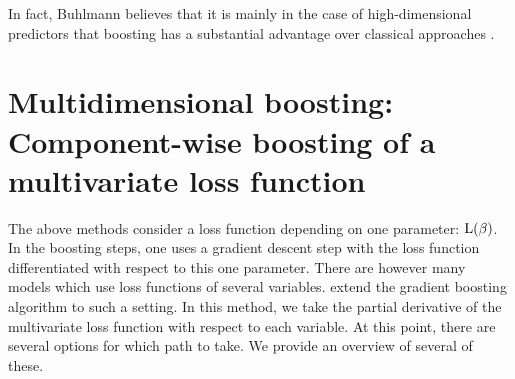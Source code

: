 In fact, Buhlmann believes that it is mainly in the case of high-dimensional predictors that boosting has a substantial advantage over classical approaches \citep{buhlmann2006}.

\section{Multidimensional boosting: Component-wise boosting of a multivariate loss function}
The above methods consider a loss function depending on one parameter: $\operatorname{L}(\beta)$. In the boosting steps, one uses a gradient descent step with the loss function differentiated with respect to this one parameter.
There are however many models which use loss functions of several variables. \citet{schmid} extend the gradient boosting algorithm \citep{friedman2001} to such a setting. In this method, we take the partial derivative of the multivariate loss function with respect to each variable. At this point, there are several options for which path to take. We provide an overview of several of these.

